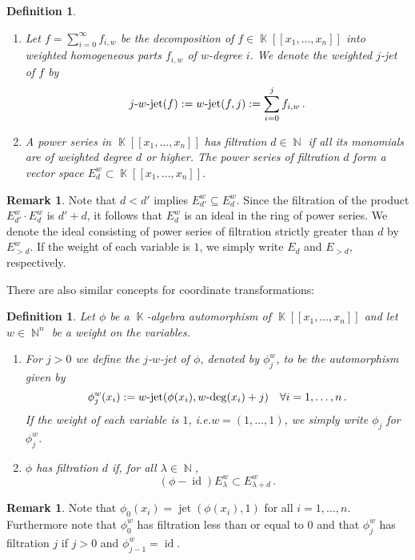 \documentclass[noend]{amsproc}
\newtheorem{defn}[theorem]{Definition}
\theoremstyle{definition}
\newtheorem{remark}[theorem]{Remark}
\DeclareMathOperator{\N}{\mathbb{N}}
\DeclareMathOperator{\K}{\mathbb{K}}
\DeclareMathOperator{\id}{id}
\DeclareMathOperator{\dash}{\!\textnormal{-}\!}
\DeclareMathOperator{\jet}{jet}
\begin{document}
\begin{defn}
\leavevmode
\begin{enumerate}
\item
Let $f = \sum_{i = 0}^{\infty} f_{i,w}$ be the decomposition of
$f \in \K[[x_1,\ldots,x_n]]$ into weighted homogeneous parts $f_{i,w}$ of
$w$-degree $i$. We denote the weighted $j$-jet of $f$ by
\[
j \dash w \dash \jet(f) := w \dash \jet(f, j) := \sum_{i = 0}^j f_{i,w} \,.
\]

\item
A power series in $\K[[x_1,\ldots,x_n]]$ has filtration $d \in \N$ if all its
monomials are of weighted degree $d$ or higher. The power series of filtration
$d$ form a vector space $E_d^w \subset \K[[x_1,\ldots,x_n]]$.
\end{enumerate}
\end{defn}

\begin{remark}
Note that $d < d'$ implies $E_{d'}^w \subseteq E_d^w$. Since the filtration of
the product $E_{d'}^w \cdot E_d^w$ is $d'+d$, it follows that $E_d^w$ is an
ideal in the ring of power series. We denote the ideal consisting of power
series of filtration strictly greater than $d$ by $E_{>d}^w$. If the weight
of each variable is $1$, we simply write $E_d$ and $E_{>d}$, respectively.
\end{remark}

There are also similar concepts for coordinate transformations:

\begin{defn}\label{phi}
Let $\phi$ be a $\K$-algebra automorphism of $\K[[x_1,\ldots,x_n]]$ and let
$w \in \N^n$ be a weight on the variables.

\begin{enumerate}
\item
For $j > 0$ we define the \emph{$j$-$w$-jet} of $\phi$, denoted by $\phi_j^w$,
to be the automorphism given by
\[
\phi_j^w(x_i) := w\dash\jet(\phi(x_i),w\dash\deg(x_i)+j) \quad
\forall i = 1,\ldots,n \,.
\]
If the weight of each variable is $1$, i.e.\@ $w = (1, \ldots, 1)$, we simply
write $\phi_j$ for $\phi_j^w$.

\item\label{enum:filtration}
$\phi$ has filtration $d$ if, for all $\lambda \in \N$,
\[
(\phi-\id)E_\lambda^w \subset E_{\lambda+d}^w \,.
\]
\end{enumerate}
\end{defn}

\begin{remark}
Note that $\phi_0(x_i) = \jet(\phi(x_i), 1)$ for all $i = 1, \ldots, n$.
Furthermore note that $\phi_0^w$ has filtration less than or equal to $0$ and
that $\phi_j^w$ has filtration $j$ if $j > 0$ and $\phi_{j-1}^w = \id$.
\end{remark}
\end{document}

